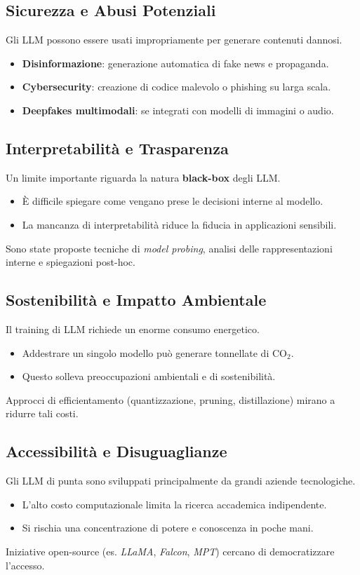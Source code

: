 \subsection{Sicurezza e Abusi Potenziali}
Gli LLM possono essere usati impropriamente per generare contenuti dannosi.
\begin{itemize}
    \item \textbf{Disinformazione}: generazione automatica di fake news e propaganda.
    \item \textbf{Cybersecurity}: creazione di codice malevolo o phishing su larga scala.
    \item \textbf{Deepfakes multimodali}: se integrati con modelli di immagini o audio.
\end{itemize}

\subsection{Interpretabilità e Trasparenza}
Un limite importante riguarda la natura \textbf{black-box} degli LLM.
\begin{itemize}
    \item È difficile spiegare come vengano prese le decisioni interne al modello.
    \item La mancanza di interpretabilità riduce la fiducia in applicazioni sensibili.
\end{itemize}
Sono state proposte tecniche di \textit{model probing}, analisi delle rappresentazioni interne e spiegazioni post-hoc.

\subsection{Sostenibilità e Impatto Ambientale}
Il training di LLM richiede un enorme consumo energetico.
\begin{itemize}
    \item Addestrare un singolo modello può generare tonnellate di CO$_2$.
    \item Questo solleva preoccupazioni ambientali e di sostenibilità.
\end{itemize}
Approcci di efficientamento (quantizzazione, pruning, distillazione) mirano a ridurre tali costi.

\subsection{Accessibilità e Disuguaglianze}
Gli LLM di punta sono sviluppati principalmente da grandi aziende tecnologiche.
\begin{itemize}
    \item L'alto costo computazionale limita la ricerca accademica indipendente.
    \item Si rischia una concentrazione di potere e conoscenza in poche mani.
\end{itemize}
Iniziative open-source (es. \textit{LLaMA}, \textit{Falcon}, \textit{MPT}) cercano di democratizzare l'accesso.

